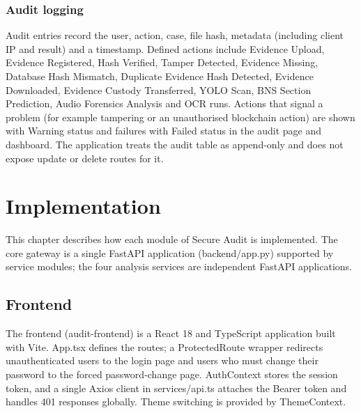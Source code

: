 \documentclass[12pt,a4paper,oneside]{report}
\newcommand{\code}[1]{{\small\ttfamily #1}}
\begin{document}
\subsection{Audit logging}
Audit entries record the user, action, case, file hash, metadata (including client IP and result) and a timestamp. Defined actions include Evidence Upload, Evidence Registered, Hash Verified, Tamper Detected, Evidence Missing, Database Hash Mismatch, Duplicate Evidence Hash Detected, Evidence Downloaded, Evidence Custody Transferred, YOLO Scan, BNS Section Prediction, Audio Forensics Analysis and OCR runs. Actions that signal a problem (for example tampering or an unauthorised blockchain action) are shown with Warning status and failures with Failed status in the audit page and dashboard. The application treats the audit table as append-only and does not expose update or delete routes for it.

\chapter{Implementation}
This chapter describes how each module of Secure Audit is implemented. The core gateway is a single FastAPI application (\code{backend/\allowbreak{}app.py}) supported by service modules; the four analysis services are independent FastAPI applications.

\section{Frontend}
The frontend (\code{audit-frontend}) is a React 18 and TypeScript application built with Vite. \code{App.tsx} defines the routes; a \code{ProtectedRoute} wrapper redirects unauthenticated users to the login page and users who must change their password to the forced password-change page. \code{AuthContext} stores the session token, and a single Axios client in \code{services/\allowbreak{}api.ts} attaches the Bearer token and handles 401 responses globally. Theme switching is provided by \code{ThemeContext}.
\end{document}
